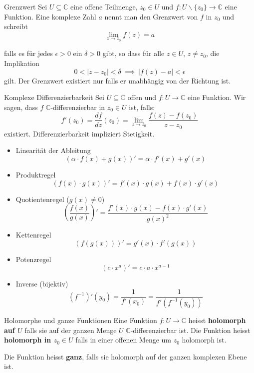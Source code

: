 \documentclass[a4paper,10pt]{article}
\def\C{\mathbb{C}}
\begin{document}
\begin{subbox}{Grenzwert}
  Sei \(U\subseteq\mathbb{C}\) eine offene Teilmenge, \(z_0\in U\) und \(f\colon U\smallsetminus\{z_0\}\to\mathbb{C}\) eine Funktion. Eine komplexe Zahl \(a\) nennt man den Grenzwert von \(f\) in \(z_0\) und schreibt
  $$
  \lim_{z\to z_0}f(z)=a
  $$
  
  falls es für jedes \(\epsilon>0\) ein \(\delta>0\) gibt, so dass für alle \(z\in U\), \(z\neq z_0\), die Implikation 
  $$
  0<|z-z_0|<\delta ~\implies ~ |f(z)-a|<\epsilon
  $$ gilt. Der Grenzwert existiert nur falls er unabhängig von der Richtung ist.
\end{subbox}

\begin{subbox}{Komplexe Differenzierbarkeit}
  Sei \(U \subseteq \mathbb{C}\) offen und \(f \colon U \to \mathbb{C}\) eine Funktion. Wir sagen, dass \(f\) $\C$-differenzierbar in \(z_0 \in U\) ist, falls:
  $$
  f'(z_0) = \frac{df}{dz}(z_0) = \lim_{z \to z_0} \dfrac{f(z)-f(z_0)}{z-z_0}
  $$
  existiert. Differenzierbarkeit impliziert Stetigkeit.
\end{subbox}

\begin{itemize}
  \item Linearität der Ableitung
  $$(\alpha \cdot f(x) + g(x))' = \alpha \cdot f'(x) + g'(x)$$
  \item Produktregel
  $$(f(x) \cdot g(x))' = f'(x) \cdot g(x) + f(x) \cdot g'(x)$$
  \item Quotientenregel ($g(x) \neq 0$)
  $$\left(\frac{f(x)}{g(x)}\right)' = \frac{f'(x) \cdot g(x) - f(x) \cdot g'(x)}{g(x)^2}$$
  \item Kettenregel
  $$(f(g(x)))' = g'(x) \cdot f'(g(x))$$
  \item Potenzregel
  $$(c \cdot x^a)' = c \cdot a \cdot x^{a - 1}$$
  \item{
    Inverse (bijektiv)
    $$
    (f^{-1})'(y_0) = \frac{1}{f'(x_0)} = \frac{1}{f'(f^{-1}(y_0))}
    $$
  }
\end{itemize}

\begin{mainbox}{Holomorphe und ganze Funktionen}
  Eine Funktion $f: U \to \C$ heisst \textbf{holomorph auf $U$} falls sie auf der ganzen Menge $U$ $\C$-differenzierbar ist. Die Funktion heisst \textbf{holomorph in $z_0 \in U$} falls in einer offenen Menge um $z_0$ holomorph ist.

  Die Funktion heisst \textbf{ganz}, falls sie holomorph auf der ganzen komplexen Ebene ist.
\end{mainbox}
\end{document}
